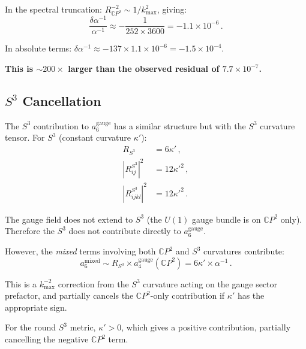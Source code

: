 \documentclass[11pt,a4paper]{article}
\newcommand{\CP}{\mathbb{C}P}
\begin{document}
In the spectral truncation: $R_{\CP^2}^{-2} \sim 1/k_{\max}^2$, giving:
\begin{equation}
\frac{\delta\alpha^{-1}}{\alpha^{-1}} \approx -\frac{1}{252 \times 3600} = -1.1 \times 10^{-6}\,.
\end{equation}

In absolute terms: $\delta\alpha^{-1} \approx -137 \times 1.1 \times 10^{-6} = -1.5 \times 10^{-4}$.

\textbf{This is $\sim 200\times$ larger than the observed residual of $7.7 \times 10^{-7}$.}

\subsection{$S^3$ Cancellation}

The $S^3$ contribution to $a_6^{\mathrm{gauge}}$ has a similar structure but with the $S^3$ curvature tensor. For $S^3$ (constant curvature $\kappa'$):
\begin{align}
R_{S^3} &= 6\kappa'\,, \\
|R_{ij}^{S^3}|^2 &= 12\kappa'^2\,, \\
|R_{ijkl}^{S^3}|^2 &= 12\kappa'^2\,.
\end{align}

The gauge field does not extend to $S^3$ (the $U(1)$ gauge bundle is on $\CP^2$ only). Therefore the $S^3$ does not contribute directly to $a_6^{\mathrm{gauge}}$.

However, the \emph{mixed} terms involving both $\CP^2$ and $S^3$ curvatures contribute:
\begin{equation}
a_6^{\mathrm{mixed}} \sim R_{S^3} \times a_4^{\mathrm{gauge}}(\CP^2) = 6\kappa' \times \alpha^{-1}\,.
\end{equation}

This is a $k_{\max}^{-2}$ correction from the $S^3$ curvature acting on the gauge sector prefactor, and partially cancels the $\CP^2$-only contribution if $\kappa'$ has the appropriate sign.

For the round $S^3$ metric, $\kappa' > 0$, which gives a positive contribution, partially cancelling the negative $\CP^2$ term.
\end{document}
